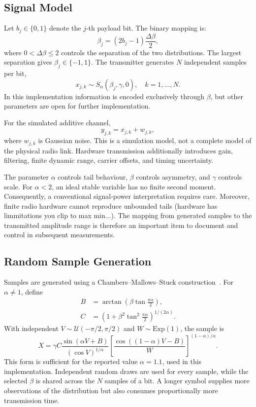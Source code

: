 \documentclass[conference]{IEEEtran}
\begin{document}
\subsection{Signal Model}
Let  $b_j\in\{0,1\}$ denote the $j$-th payload bit. The binary mapping is:
\begin{equation}
\beta_j = (2b_j - 1) \frac{\Delta \beta}{2},
\end{equation}
where $0<\Delta\beta\leq2$ controls the separation of the two distributions. The largest separation gives $\beta_j\in\{-1,1\}$. The transmitter generates $N$ independent samples per bit,
\begin{equation}
x_{j,k}\sim S_\alpha(\beta_j,\gamma,0),\quad k=1,\ldots,N.
\end{equation}
In this implementation information is encoded exclusively through $\beta$, but other parameters are open for further implementation.


For the simulated additive channel,
\begin{equation}
y_{j,k}=x_{j,k}+w_{j,k},
\end{equation}
where $w_{j,k}$ is Gaussian noise. This is a simulation model, not a complete model of the physical radio link. Hardware transmission additionally introduces gain, filtering, finite dynamic range, carrier offsets, and timing uncertainty.

The parameter $\alpha$ controls tail behaviour, $\beta$ controls asymmetry, and $\gamma$ controls scale. For $\alpha<2$, an ideal stable variable has no finite second moment. Consequently, a conventional signal-power interpretation requires care. Moreover, finite radio hardware cannot reproduce unbounded tails (hardware has limmitations you clip to max min...). The mapping from generated samples to the transmitted amplitude range is therefore an important item to document and control in subsequent measurements.

\subsection{Random Sample Generation}
Samples are generated using a Chambers--Mallows--Stuck construction~\cite{b8}. For $\alpha\ne1$, define
\begin{align}
B&=\arctan\left(\beta\tan\frac{\pi\alpha}{2}\right),\\
C&=\left(1+\beta^2\tan^2\frac{\pi\alpha}{2}\right)^{1/(2\alpha)}.
\end{align}
With independent $V\sim\mathcal U(-\pi/2,\pi/2)$ and $W\sim\mathrm{Exp}(1)$, the sample is
\begin{equation}
X=\gamma C\frac{\sin(\alpha V+B)}{(\cos V)^{1/\alpha}}
\left[\frac{\cos((1-\alpha)V-B)}{W}\right]^{(1-\alpha)/\alpha}.
\end{equation}
This form is sufficient for the reported value $\alpha=1.1$, used in this implementation. Independent random draws are used for every sample, while the selected $\beta$ is shared across the $N$ samples of a bit. A longer symbol supplies more observations of the distribution but also consumes proportionally more transmission time.
\end{document}
